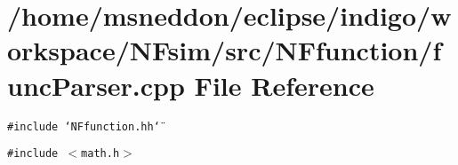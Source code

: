 \section{/home/msneddon/eclipse/indigo/workspace/NFsim/src/NFfunction/funcParser.cpp File Reference}
\label{funcParser_8cpp}


{\tt \#include \char`\"{}NFfunction.hh\char`\"{}}\par
{\tt \#include $<$math.h$>$}\par
